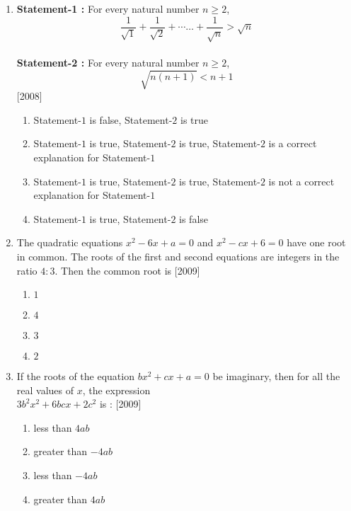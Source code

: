 \documentclass[journal,12pt,twocolumn]{IEEEtran}
\theoremstyle{remark}
\begin{document}
\begin{enumerate}
\begin{enumerate}
\end{enumerate}

\item \textbf{Statement-1 :} For every natural number $n\geq 2$,\\
$$\frac{1}{\sqrt{1}} + \frac{1}{\sqrt{2}} + \cdots\dots + \frac{1}{\sqrt{n}} > \sqrt{n}$$\\
\textbf{Statement-2 :} For every natural number $n\geq 2$,\\
$$\sqrt{n(n + 1)} < n + 1$$
\hfill[2008]\\

\begin{enumerate}

	\item  Statement-$1$ is false, Statement-$2$ is true
	\item  Statement-$1$ is true, Statement-$2$ is true, Statement-$2$ is a correct explanation for Statement-$1$
	\item  Statement-$1$ is true, Statement-$2$ is true, Statement-$2$ is not a correct explanation for Statement-$1$
	\item  Statement-$1$ is true, Statement-$2$ is false

\end{enumerate}

\item The quadratic equations $x^2 - 6x + a = 0$ and $x^2 - cx + 6 = 0$ have one root in common. The roots of the first and second equations are integers in the ratio $4 : 3$. Then the common root is
\hfill[2009]

\begin{enumerate}

	\item  $1$
	\item  $4$
	\item  $3$
	\item  $2$

\end{enumerate}

\item If the roots of the equation $bx^2 + cx + a = 0$ be imaginary, then for all the real values of $x$, the expression\\
$3b^2x^2 + 6bcx + 2c^2$ is :
\hfill[2009]

\begin{enumerate}

	\item  less than $4ab$
	\item  greater than $-4ab$
	\item  less than $-4ab$
	\item  greater than $4ab$


\end{enumerate}
\end{enumerate}
\end{document}
